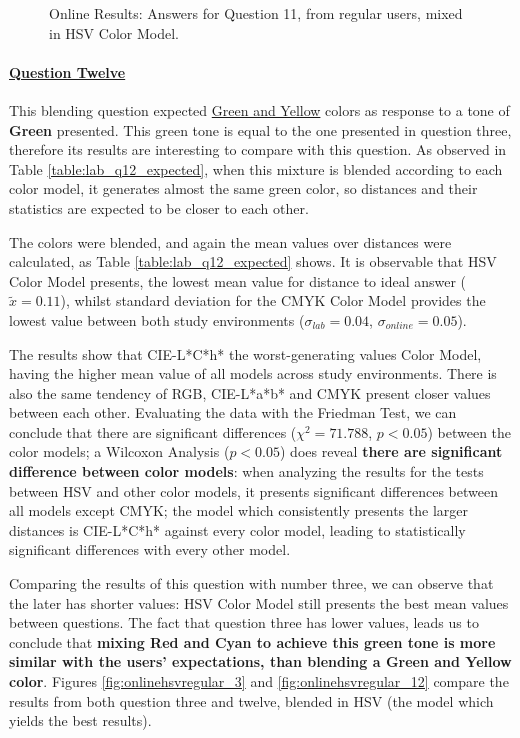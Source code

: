 \begin{figure}[htbp]
\begin{minipage}{0.48\textwidth}
    \caption[Online Results: Answers for Question 11, from regular users, mixed in HSV Color Model.]{Online Results: Answers for Question 11, from regular users, mixed in HSV Color Model.}
    \label{fig:onlinehsvregular_11}
  \end{minipage}
\end{figure}
%
\paragraph{\ul{Question Twelve}}
%
This blending question expected \ul{Green and Yellow} colors as response to a tone of \textbf{Green} presented. This green tone is equal to the one presented in question three, therefore
its results are interesting to compare with this question. As observed in Table \ref{table:lab_q12_expected}, when this mixture is blended according to each color model, it generates almost
the same green color, so distances and their statistics are expected to be closer to each other. \par
%
The colors were blended, and again the mean values over distances were calculated, as Table \ref{table:lab_q12_expected} shows. It is observable that HSV Color Model presents,
the lowest mean value for distance to ideal answer ($\tilde{x} = 0.11$), whilst standard deviation for the CMYK Color Model provides the lowest value between both study environments
($\sigma_{lab} = 0.04$, $\sigma_{online} = 0.05$). \par
%
The results show that CIE-L*C*h* the worst-generating values Color Model, having the higher mean value of all models across study environments. There is also the same tendency of RGB,
CIE-L*a*b* and CMYK present closer values between each other. Evaluating the data with the Friedman Test, we can conclude that there are significant differences ($\chi^2 = 71.788$, $p < 0.05$)
between the color models; a Wilcoxon Analysis ($p < 0.05$) does reveal \textbf{there are significant difference between color models}: when analyzing the results for the tests between HSV and other
color models, it presents significant differences between all models except CMYK; the model which consistently presents the larger distances is CIE-L*C*h* against every color model, leading to
statistically significant differences with every other model. \par
%
Comparing the results of this question with number three, we can observe that the later has shorter values: HSV Color Model still presents the best mean values between questions.
The fact that question three has lower values, leads us to conclude that \textbf{mixing Red and Cyan to achieve this green tone is more similar with the users' expectations, than blending a Green and
Yellow color}. Figures \ref{fig:onlinehsvregular_3} and \ref{fig:onlinehsvregular_12} compare the results from both question three and twelve, blended in HSV (the model which yields the best results). \par
